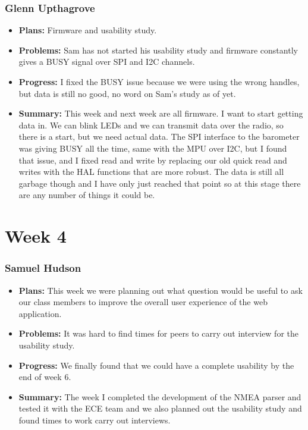 \documentclass[onecolumn, draftclsnofoot,10pt, compsoc]{IEEEtran}
\begin{document}
\subsubsection{Glenn Upthagrove}
\begin {itemize}
 \item \textbf{Plans: }Firmware and usability study.  
 \item \textbf{Problems: }Sam has not started his usability study and firmware constantly gives a BUSY signal over SPI and I2C channels.  
 \item \textbf{Progress: }I fixed the BUSY issue because we were using the wrong handles, but data is still no good, no word on Sam's study as of yet.  
 \item \textbf{Summary: }This week and next week are all firmware. I want to start getting data in. We can blink LEDs and we can transmit data over the radio, so there is a start, but we need actual data. The SPI interface to the barometer was giving BUSY all the time, same with the MPU over I2C, but I found that issue, and I fixed read and write by replacing our old quick read and writes with the HAL functions that are more robust. The data is still all garbage though and I have only just reached that point so at this stage there are any number of things it could be.   
\end {itemize}

\section{Week 4}
\subsubsection{Samuel Hudson}
\begin {itemize}
 \item \textbf{Plans: }This week we were planning out what question would be useful to ask our class members to improve the overall user experience of the web application. 
 \item \textbf{Problems: }It was hard to find times for peers to carry out interview for the usability study. 
 \item \textbf{Progress: }We finally found that we could have a complete usability by the end of week 6.
 \item \textbf{Summary: }The week I completed the development of the NMEA parser and tested it with the ECE team and we also planned out the usability study and found times to work carry out interviews.
\end {itemize}
\end{document}

